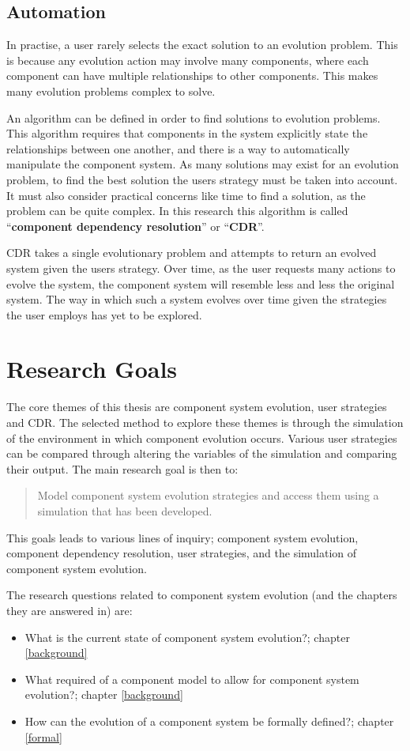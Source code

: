 \subsection{Automation}
In practise, a user rarely selects the exact solution to an evolution problem.
This is because any evolution action may involve many components, where each component can have multiple relationships to other components.
This makes many evolution problems complex to solve.

An algorithm can be defined in order to find solutions to evolution problems.
This algorithm requires that components in the system explicitly state the relationships between one another, and there is a way to automatically manipulate the component system.
As many solutions may exist for an evolution problem, to find the best solution the users strategy must be taken into account.
It must also consider practical concerns like time to find a solution, as the problem can be quite complex.
In this research this algorithm is called ``\textbf{component dependency resolution}'' or ``\textbf{CDR}''.

CDR takes a single evolutionary problem and attempts to return an evolved system given the users strategy.
Over time, as the user requests many actions to evolve the system, the component system will resemble less and less the original system.
The way in which such a system evolves over time given the strategies the user employs has yet to be explored. 

\section{Research Goals}
The core themes of this thesis are component system evolution, user strategies and CDR.
The selected method to explore these themes is through the simulation of the environment in which component evolution occurs.
Various user strategies can be compared through altering the variables of the simulation and comparing their output.
The main research goal is then to:
\begin{quote}
Model component system evolution strategies and access them using a simulation that has been developed.
\end{quote}

This goals leads to various lines of inquiry; component system evolution, component dependency resolution, user strategies, and the simulation of component system evolution.

The research questions related to component system evolution (and the chapters they are answered in) are:
\begin{itemize}
	\item What is the current state of component system evolution?; chapter \ref{background}
	\item What required of a component model to allow for component system evolution?; chapter \ref{background}
	\item How can the evolution of a component system be formally defined?; chapter \ref{formal}
\end{itemize}

